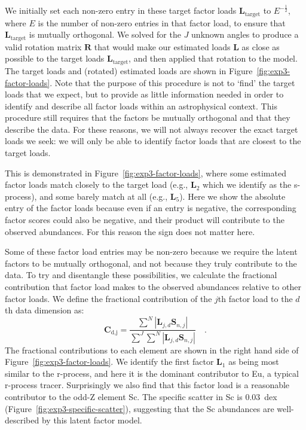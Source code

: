 \documentclass[twocolumn]{aastex62}
\newcommand{\vect}[1]{\boldsymbol{\mathbf{#1}}}
\renewcommand{\vec}[1]{\vect{#1}}
\newcommand{\factorloads}{\textbf{L}}
\newcommand{\factorscores}{\textbf{S}}
\newcommand{\NumLatentFactors}{J}
\begin{document}
We initially set each non-zero entry in these target factor loads $\factorloads_\textrm{target}$ to $E^{-\frac{1}{2}}$, where $E$ is the number of non-zero entries in that factor load, to ensure that $\factorloads_\textrm{target}$ is mutually orthogonal.
We solved for the $\NumLatentFactors$ unknown angles to produce a valid rotation matrix $\vec{R}$ that would make our estimated loads $\factorloads$ as close as possible to the target loads $\factorloads_\textrm{target}$, and then applied that rotation to the model. The target loads and (rotated) estimated loads are shown in Figure~\ref{fig:exp3-factor-loads}. Note that the purpose of this procedure is not to `find' the target loads that we expect, but to provide as little information needed in order to identify and describe all factor loads within an astrophysical context. This procedure still requires that the factors be mutually orthogonal and that they describe the data. For these reasons, we will not always recover the exact target loads we seek: we will only be able to identify factor loads that are closest to the target loads.

This is demonstrated in Figure~\ref{fig:exp3-factor-loads}, where some estimated factor loads match
closely to the target load (e.g., $\mathbf{L}_2$ which we identify as the s-process), and some barely
match at all (e.g., $\mathbf{L}_5$). Here we show the absolute entry of the factor loads because even
if an entry is negative, the corresponding factor scores could also be negative, and their product will contribute to the observed abundances. For this reason the sign does not matter here.

Some of these factor load entries may be non-zero because we require the latent factors to
be mutually orthogonal, and not because they truly contribute to the data. To try and
disentangle these possibilities, we calculate the fractional contribution that factor
load makes to the observed abundances relative to other factor loads. We define the
fractional contribution of the $j$th factor load to the $d$th
data dimension as:
\begin{equation}
	\mathbf{C}_\textrm{d,j} = \frac{\sum^{N}|\factorloads_{j,d}\factorscores_{n,j}|}{\sum^J\sum^{N}|\factorloads_{j,d}\factorscores_{n,j}|} \quad .
\end{equation}
The fractional contributions to each element are shown in the right hand side of
Figure~\ref{fig:exp3-factor-loads}. We identify the first factor $\mathbf{L}_1$ 
as being most similar to the r-process, and here it is the dominant contributor to Eu, a typical r-process tracer. Surprisingly we also find that this factor load is a reasonable contributor to the odd-Z element Sc. The specific scatter in Sc is 0.03~dex (Figure~\ref{fig:exp3-specific-scatter}), suggesting that the Sc abundances are well-described by this latent factor model.
 
\end{document}
